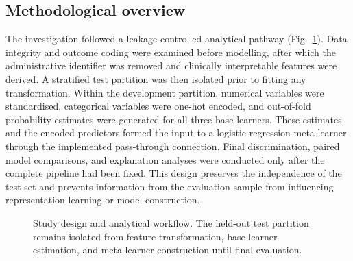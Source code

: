 \documentclass{elektr}
\begin{document}
\subsection{Methodological overview}
The investigation followed a leakage-controlled analytical pathway (Fig.~\ref{fig:workflow}). Data integrity and outcome coding were examined before modelling, after which the administrative identifier was removed and clinically interpretable features were derived. A stratified test partition was then isolated prior to fitting any transformation. Within the development partition, numerical variables were standardised, categorical variables were one-hot encoded, and out-of-fold probability estimates were generated for all three base learners. These estimates and the encoded predictors formed the input to a logistic-regression meta-learner through the implemented pass-through connection. Final discrimination, paired model comparisons, and explanation analyses were conducted only after the complete pipeline had been fixed. This design preserves the independence of the test set and prevents information from the evaluation sample from influencing representation learning or model construction.

\begin{figure}[H]
\centering
{}
\caption{Study design and analytical workflow. The held-out test partition remains isolated from feature transformation, base-learner estimation, and meta-learner construction until final evaluation.}
\label{fig:workflow}
\end{figure}
\end{document}
